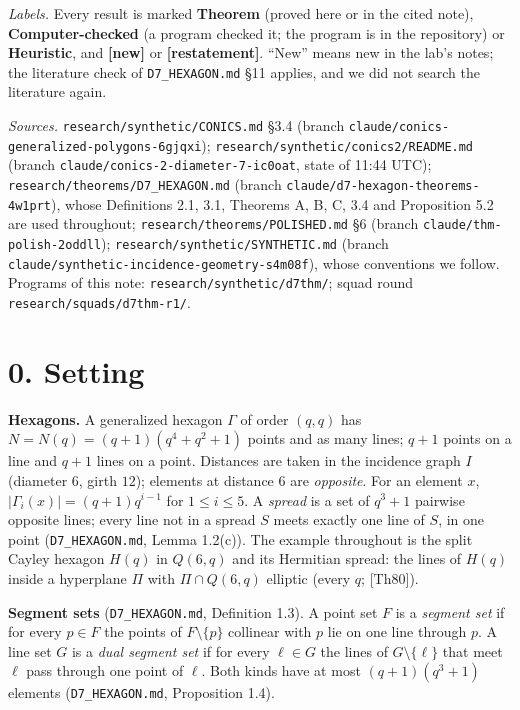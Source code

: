 \documentclass[
  10pt,
]{article}
\begin{document}
\emph{Labels.} Every result is marked \textbf{Theorem} (proved here or
in the cited note), \textbf{Computer-checked} (a program checked it; the
program is in the repository) or \textbf{Heuristic}, and
\textbf{{[}new{]}} or \textbf{{[}restatement{]}}. ``New'' means new in
the lab's notes; the literature check of \texttt{D7\_HEXAGON.md} §11
applies, and we did not search the literature again.

\emph{Sources.} \texttt{research/synthetic/CONICS.md} §3.4 (branch
\texttt{claude/conics-generalized-polygons-6gjqxi});
\texttt{research/synthetic/conics2/README.md} (branch
\texttt{claude/conics-2-diameter-7-ic0oat}, state of 11:44 UTC);
\texttt{research/theorems/D7\_HEXAGON.md} (branch
\texttt{claude/d7-hexagon-theorems-4w1prt}), whose Definitions 2.1, 3.1,
Theorems A, B, C, 3.4 and Proposition 5.2 are used throughout;
\texttt{research/theorems/POLISHED.md} §6 (branch
\texttt{claude/thm-polish-2oddll});
\texttt{research/synthetic/SYNTHETIC.md} (branch
\texttt{claude/synthetic-incidence-geometry-s4m08f}), whose conventions
we follow. Programs of this note: \texttt{research/synthetic/d7thm/};
squad round \texttt{research/squads/d7thm-r1/}.

\hypertarget{setting}{%
\section{0. Setting}\label{setting}}

\textbf{Hexagons.} A generalized hexagon \(\Gamma\) of order \((q,q)\)
has \(N=N(q)=(q+1)(q^4+q^2+1)\) points and as many lines; \(q+1\) points
on a line and \(q+1\) lines on a point. Distances are taken in the
incidence graph \(I\) (diameter \(6\), girth \(12\)); elements at
distance \(6\) are \emph{opposite}. For an element \(x\),
\(|\Gamma_i(x)|=(q+1)q^{i-1}\) for \(1\le i\le5\). A \emph{spread} is a
set of \(q^3+1\) pairwise opposite lines; every line not in a spread
\(S\) meets exactly one line of \(S\), in one point
(\texttt{D7\_HEXAGON.md}, Lemma 1.2(c)). The example throughout is the
split Cayley hexagon \(H(q)\) in \(Q(6,q)\) and its Hermitian spread:
the lines of \(H(q)\) inside a hyperplane \(\Pi\) with
\(\Pi\cap Q(6,q)\) elliptic (every \(q\); {[}Th80{]}).

\textbf{Segment sets} (\texttt{D7\_HEXAGON.md}, Definition 1.3). A point
set \(F\) is a \emph{segment set} if for every \(p\in F\) the points of
\(F\setminus\{p\}\) collinear with \(p\) lie on one line through \(p\).
A line set \(G\) is a \emph{dual segment set} if for every \(\ell\in G\)
the lines of \(G\setminus\{\ell\}\) that meet \(\ell\) pass through one
point of \(\ell\). Both kinds have at most \((q+1)(q^3+1)\) elements
(\texttt{D7\_HEXAGON.md}, Proposition 1.4).
\end{document}
